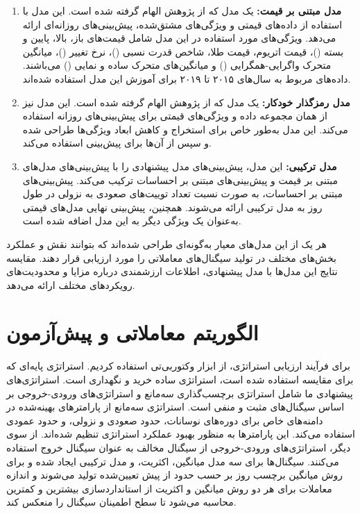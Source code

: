 \begin{enumerate}
    \item \textbf{مدل مبتنی بر قیمت:} یک مدل  که از پژوهش \cite{prebit_zou_2023} الهام گرفته شده است. این مدل با استفاده از داده‌های قیمتی و ویژگی‌های مشتق‌شده، پیش‌بینی‌های روزانه‌ای ارائه می‌دهد. ویژگی‌های مورد استفاده در این مدل شامل قیمت‌های باز، بالا، پایین و بسته ()، قیمت اتریوم، قیمت طلا، شاخص قدرت نسبی ()، نرخ تغییر ()، میانگین متحرک واگرایی-همگرایی () و میانگین‌های متحرک ساده و نمایی () می‌باشند. داده‌های مربوط به سال‌های ۲۰۱۵ تا ۲۰۱۹ برای آموزش این مدل استفاده شده‌اند.
    
    \item \textbf{مدل رمزگذار خودکار:} یک مدل  که از پژوهش \cite{zha2022time} الهام گرفته شده است. این مدل نیز از همان مجموعه داده و ویژگی‌های قیمتی برای پیش‌بینی‌های روزانه استفاده می‌کند. این مدل به‌طور خاص برای استخراج و کاهش ابعاد ویژگی‌ها طراحی شده و سپس از آن‌ها برای پیش‌بینی استفاده می‌کند.
    
    \item \textbf{مدل ترکیبی:} این مدل، پیش‌بینی‌های مدل پیشنهادی را با پیش‌بینی‌های مدل‌های مبتنی بر قیمت و پیش‌بینی‌های مبتنی بر احساسات ترکیب می‌کند. پیش‌بینی‌های مبتنی بر احساسات، به صورت نسبت تعداد توییت‌های صعودی به نزولی در طول روز به مدل ترکیبی ارائه می‌شوند. همچنین، پیش‌بینی نهایی مدل‌های قیمتی به‌عنوان یک ویژگی دیگر به این مدل اضافه شده است.
\end{enumerate}

هر یک از این مدل‌های معیار به‌گونه‌ای طراحی شده‌اند که بتوانند نقش و عملکرد بخش‌های مختلف در تولید سیگنال‌های معاملاتی را مورد ارزیابی قرار دهند. مقایسه نتایج این مدل‌ها با مدل پیشنهادی، اطلاعات ارزشمندی درباره مزایا و محدودیت‌های رویکردهای مختلف ارائه می‌دهد.


\section{الگوریتم معاملاتی و پیش‌آزمون}
\label{sec:backtest}
برای فرآیند ارزیابی استراتژی، از ابزار وکتور‌بی‌تی استفاده کردیم. استراتژی پایه‌ای که برای مقایسه استفاده شده است، استراتژی ساده خرید و نگهداری است. استراتژی‌های پیشنهادی ما شامل استراتژی برچسب‌گذاری سه‌مانع و استراتژی‌های ورودی-خروجی بر اساس سیگنال‌های مثبت و منفی است. استراتژی سه‌مانع از پارامترهای بهینه‌شده در دامنه‌های خاص برای دوره‌های نوسانات، حدود صعودی و نزولی، و حدود عمودی استفاده می‌کند. این پارامترها به منظور بهبود عملکرد استراتژی تنظیم شده‌اند. از سوی دیگر، استراتژی‌های ورودی-خروجی از سیگنال مخالف به عنوان سیگنال خروج استفاده می‌کنند. سیگنال‌ها برای سه مدل میانگین، اکثریت، و مدل ترکیبی ایجاد شده و برای روش میانگین برچسب روز بر حسب حدود از پیش تعیین‌شده تولید می‌شوند و اندازه معاملات برای هر دو روش میانگین و اکثریت از استاندارد‌سازی بیشترین‌ و کمترین محاسبه می‌شود تا سطح اطمینان سیگنال را منعکس کند.


